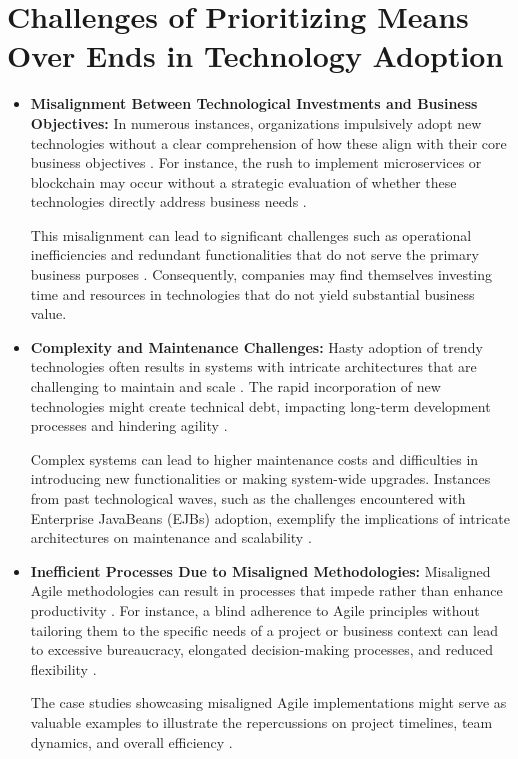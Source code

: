 \documentclass[a4Paper]{article}
\begin{document}
\section{Challenges of Prioritizing Means Over Ends in Technology Adoption}
\begin{itemize}
    \item \textbf{Misalignment Between Technological Investments and Business Objectives: } In numerous instances, organizations impulsively adopt new technologies without a clear comprehension of how these align with their core business objectives \cite{abrahamsson2017agile}. For instance, the rush to implement microservices or blockchain may occur without a strategic evaluation of whether these technologies directly address business needs \cite{anzoategui2019endogenous}.
    
    This misalignment can lead to significant challenges such as operational inefficiencies and redundant functionalities that do not serve the primary business purposes \cite{rahimi2016business}. Consequently, companies may find themselves investing time and resources in technologies that do not yield substantial business value.
    
    \item \textbf{Complexity and Maintenance Challenges: } Hasty adoption of trendy technologies often results in systems with intricate architectures that are challenging to maintain and scale \cite{dube2020review}. The rapid incorporation of new technologies might create technical debt, impacting long-term development processes and hindering agility \cite{al2020impact}.
    
    Complex systems can lead to higher maintenance costs and difficulties in introducing new functionalities or making system-wide upgrades. Instances from past technological waves, such as the challenges encountered with Enterprise JavaBeans (EJBs) adoption, exemplify the implications of intricate architectures on maintenance and scalability \cite{anzoategui2019endogenous}.
    
    \item \textbf{Inefficient Processes Due to Misaligned Methodologies: } Misaligned Agile methodologies can result in processes that impede rather than enhance productivity \cite{abrahamsson2017agile}. For instance, a blind adherence to Agile principles without tailoring them to the specific needs of a project or business context can lead to excessive bureaucracy, elongated decision-making processes, and reduced flexibility \cite{hayat2019influence}.
    
    The case studies showcasing misaligned Agile implementations might serve as valuable examples to illustrate the repercussions on project timelines, team dynamics, and overall efficiency \cite{abrahamsson2017agile}.
    
\end{itemize}
\end{document}
